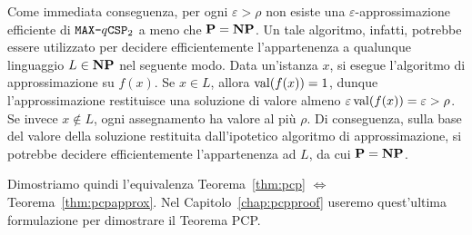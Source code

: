 Come immediata conseguenza, per ogni $\varepsilon > \rho$ non esiste una
$\varepsilon$-approssimazione efficiente di $\texttt{MAX-}q\mathtt{CSP}_2$
a meno che $\mathbf{P} = \mathbf{NP}$.
Un tale algoritmo, infatti, potrebbe essere utilizzato per decidere
efficientemente l'appartenenza a qualunque linguaggio $L \in \mathbf{NP}$ nel
seguente modo.
Data un'istanza $x$, si esegue l'algoritmo di approssimazione su $f(x)$.
Se $x \in L$, allora $\operatorname{val}(f(x)) = 1$, dunque l'approssimazione restituisce una
soluzione di valore almeno $\varepsilon \operatorname{val}(f(x)) = \varepsilon > \rho$.
Se invece $x \notin L$, ogni assegnamento ha valore al più $\rho$.
Di conseguenza, sulla base del valore della soluzione restituita dall'ipotetico
algoritmo di approssimazione, si potrebbe decidere efficientemente
l'appartenenza ad $L$, da cui $\mathbf{P} = \mathbf{NP}$.

Dimostriamo quindi l'equivalenza Teorema~\ref{thm:pcp} $\iff$
Teorema~\ref{thm:pcpapprox}. Nel Capitolo~\ref{chap:pcpproof} useremo
quest'ultima formulazione per dimostrare il Teorema PCP.

